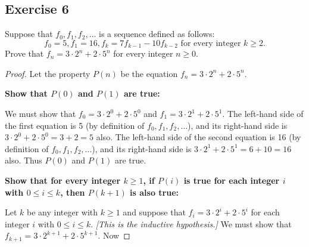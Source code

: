 \documentclass[14pt]{extarticle}
\begin{document}
\subsection{Exercise 6}
Suppose that $f_0, f_1, f_2, \ldots$ is a sequence defined
as follows:
\[
    f_0 = 5, f_1 = 16, f_k = 7f_{k-1} - 10f_{k-2} \text{ for every integer $k \geq 2$.}
\]
Prove that $f_n = 3 \cdot 2^n + 2 \cdot 5^n$ for every integer $n \geq 0$.

\begin{proof}
    Let the property $P(n)$ be the equation $f_n = 3 \cdot 2^n + 2 \cdot 5^n$.

        {\bf Show that $P(0)$ and $P(1)$ are true:}

    We must show that $f_0 = 3 \cdot 2^0 + 2 \cdot 5^0$ and $f_1 = 3 \cdot 2^1 + 2 \cdot 5^1$.
    The left-hand side of the first equation is 5 (by definition of $f_0, f_1, f_2, \ldots$), and its right-hand side is $3 \cdot 2^0 + 2 \cdot 5^0 = 3 + 2 = 5$ also.
    The left-hand side of the second equation is 16 (by definition of $f_0, f_1, f_2, \ldots$), and its right-hand side is $3 \cdot 2^1 + 2 \cdot 5^1 = 6 + 10 = 16$ also.
    Thus $P(0)$ and $P(1)$ are true.

        {\bf Show that for every integer $k \geq 1$, if $P(i)$ is true for each integer $i$ with $0 \leq i \leq k$, then $P(k + 1)$ is also true:}

    Let $k$ be any integer with $k \geq 1$ and suppose that $f_i = 3 \cdot 2^i + 2 \cdot 5^i$ for each integer $i$ with $0 \leq i \leq k$. {\it [This is the inductive hypothesis.]}
    We must show that $f_{k+1} = 3 \cdot 2^{k+1} + 2 \cdot 5^{k+1}$. Now


\end{proof}
\end{document}
